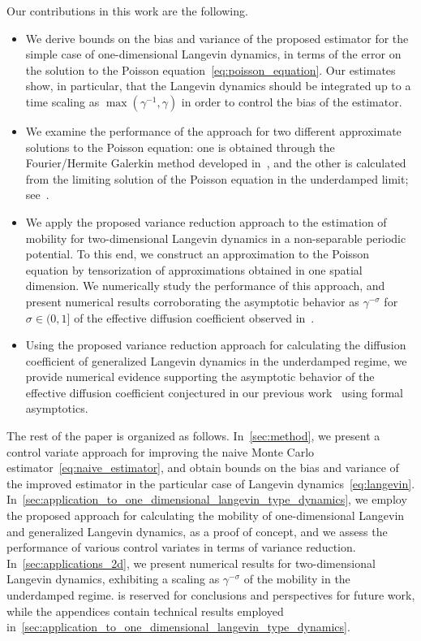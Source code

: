 \documentclass[11pt,a4paper]{article}
\begin{document}
Our contributions in this work are the following.
\begin{itemize}
    \item
        We derive bounds on the bias and variance of the proposed estimator for the simple case of one-dimensional Langevin dynamics,
        in terms of the error on the solution to the Poisson equation~\eqref{eq:poisson_equation}.
        Our estimates show, in particular, that the Langevin dynamics should be integrated up to a time scaling as $\max(\gamma^{-1}, \gamma)$ in order to control the bias of the estimator.
    \item
        We examine the performance of the approach for two different approximate solutions to the Poisson equation:
        one is obtained through the Fourier/Hermite Galerkin method developed in~\cite{roussel2018spectral},
        and the other is calculated from the limiting solution of the Poisson equation in the underdamped limit;
        see~\cite{MR2427108}.
    \item
        We apply the proposed variance reduction approach to the estimation of mobility for two-dimensional Langevin dynamics in a non-separable periodic potential.
        To this end, we construct an approximation to the Poisson equation by tensorization of approximations obtained in one spatial dimension.
        We numerically study the performance of this approach,
        and present numerical results corroborating the asymptotic behavior as $\gamma^{-\sigma}$ for $\sigma \in (0, 1]$ of the effective diffusion coefficient
        observed in~\cite{roussel_thesis}.
    \item
        Using the proposed variance reduction approach
        for calculating the diffusion coefficient of generalized Langevin dynamics in the underdamped regime,
        we provide numerical evidence supporting the asymptotic behavior of the effective diffusion coefficient conjectured in our previous work~\cite{GPGSUV21} using formal asymptotics.
\end{itemize}
The rest of the paper is organized as follows.
In~\cref{sec:method},
we present a control variate approach for improving the naive Monte Carlo estimator~\eqref{eq:naive_estimator},
and obtain bounds on the bias and variance of the improved estimator in the particular case of Langevin dynamics~\eqref{eq:langevin}.
In~\cref{sec:application_to_one_dimensional_langevin_type_dynamics},
we employ the proposed approach for calculating the mobility of one-dimensional Langevin and generalized Langevin dynamics,
as a proof of concept,
and we assess the performance of various control variates in terms of variance reduction.
In~\cref{sec:applications_2d},
we present numerical results for two-dimensional Langevin dynamics,
exhibiting a scaling as $\gamma^{-\sigma}$ of the mobility in the underdamped regime.
 is reserved for conclusions and perspectives for future work,
while the appendices contain technical results employed in~\cref{sec:application_to_one_dimensional_langevin_type_dynamics}.
\end{document}
